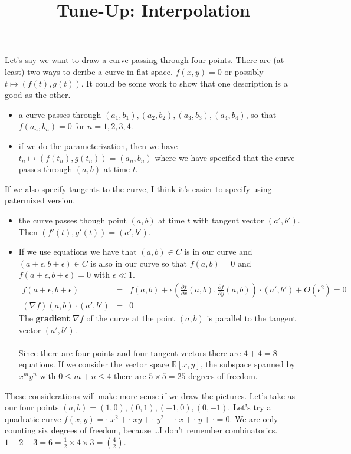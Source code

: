 \documentclass[12pt]{article}
\title{Tune-Up: Interpolation}
\date{}
\begin{document}
\sffamily

\maketitle


\noindent Let's say we want to draw a curve passing through four points.  There are (at least) two ways to deribe a curve in flat space.  $f(x,y) = 0$ or possibly $t \mapsto (f(t), g(t))$.  It could be some work to show that one description is a good as the other.  
\begin{itemize}
	\item a curve passes through $(a_1, b_1), (a_2, b_2), (a_3, b_3), (a_4, b_4)$, so that $f(a_n, b_n) = 0$ for $n = 1,2,3,4$.  
	\item if we do the parameterization, then we have $t_n \mapsto (f(t_n), g(t_n)) = (a_n, b_n)$ where we have specified that the curve passes through $(a,b)$ at time $t$.  
\end{itemize} 
If we also specify tangents to the curve, I think it's easier to specify using patermized version.
\begin{itemize}
	\item the curve passes though point $(a,b)$ at time $t$ with tangent vector $(a', b')$.  Then $(f'(t), g'(t)) = (a', b')$.
	\item If we use equations we have that $(a,b) \in C$ is in our curve and $(a + \epsilon, b + \epsilon) \in C$ is also in our curve so that $f(a,b) = 0$ and $f(a+\epsilon, b + \epsilon) = 0$ with $\epsilon \ll 1$. 
	\begin{eqnarray*} f(a + \epsilon, b + \epsilon) &=& f(a,b) + \epsilon \left(\frac{\partial f}{\partial x}(a,b) ,  \frac{\partial f}{\partial y}(a,b) \right)\cdot (a', b') + O(\epsilon^2) = 0 \\ 
(\nabla f)(a,b)\cdot(a',b')	&=& 0 \end{eqnarray*}
	The \textbf{gradient} $\nabla f$ of the curve at the point $(a,b)$ is parallel to the tangent vector $(a', b')$. \\ \\ 
Since there are four points and four tangent vectors there are $4+4 = 8$ equations.  If we consider the vector space $\mathbb{R}[x,y]$, the subspace spanned by $ x^m y^n$ with $0 \leq m+n \leq 4$ there are $5 \times 5 = 25$ degrees of freedom.    
\end{itemize}
These considerations will make more sense if we draw the pictures.  Let's take as our four points $(a,b) = (1,0), (0,1), (-1,0), (0,-1)$.  Let's try a quadratic curve $f(x,y) =  \cdot \; x^2 + \cdot \; xy + \cdot \; y^2 + \cdot \; x + \cdot \; y + \cdot = 0$. We are only counting six degrees of freedom, because \dots I don't remember combinatorics. $ 1 + 2 + 3  = 6 = \frac{1}{2} \times 4 \times 3 = \binom{4}{2}$. \\ \\
\end{document}
